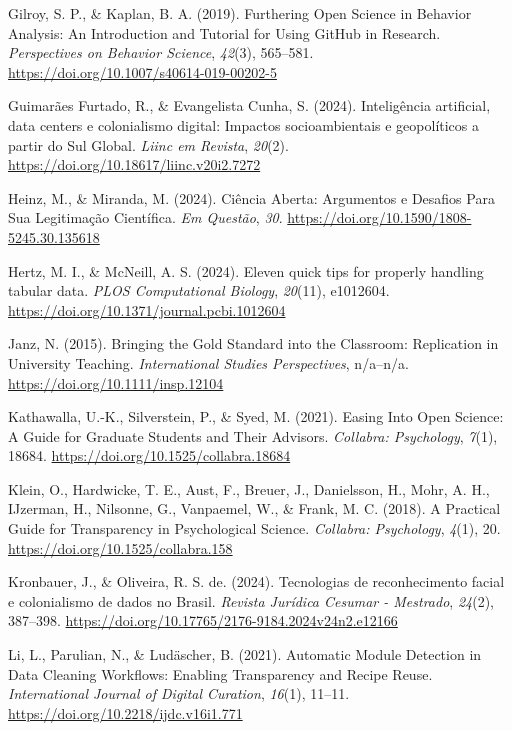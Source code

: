 \documentclass[
  a4paper,
]{book}
\newlength{\cslhangindent}
\newenvironment{CSLReferences}[2] %
 {\begin{list}{}{%
  \setlength{\itemindent}{0pt}
  \setlength{\leftmargin}{0pt}
  \setlength{\parsep}{0pt}
  \ifodd #1
   \setlength{\leftmargin}{\cslhangindent}
   \setlength{\itemindent}{-1\cslhangindent}
  \fi
  \setlength{\itemsep}{#2\baselineskip}}}
 {\end{list}}
\begin{document}
\begin{CSLReferences}{1}{0}
Gilroy, S. P., \& Kaplan, B. A. (2019). Furthering {Open Science} in
{Behavior Analysis}: {An Introduction} and {Tutorial} for {Using GitHub}
in {Research}. \emph{Perspectives on Behavior Science}, \emph{42}(3),
565--581. \url{https://doi.org/10.1007/s40614-019-00202-5}

Guimarães Furtado, R., \& Evangelista Cunha, S. (2024). Inteligência
artificial, data centers e colonialismo digital: Impactos
socioambientais e geopolíticos a partir do Sul Global. \emph{Liinc em
Revista}, \emph{20}(2). \url{https://doi.org/10.18617/liinc.v20i2.7272}

Heinz, M., \& Miranda, M. (2024). Ci{ê}ncia {Aberta}: Argumentos e
Desafios Para Sua Legitima{ç}{ã}o Cient{í}fica. \emph{Em Quest{ã}o},
\emph{30}. \url{https://doi.org/10.1590/1808-5245.30.135618}

Hertz, M. I., \& McNeill, A. S. (2024). Eleven quick tips for properly
handling tabular data. \emph{PLOS Computational Biology}, \emph{20}(11),
e1012604. \url{https://doi.org/10.1371/journal.pcbi.1012604}

Janz, N. (2015). Bringing the {Gold Standard} into the {Classroom}:
{Replication} in {University Teaching}. \emph{International Studies
Perspectives}, n/a--n/a. \url{https://doi.org/10.1111/insp.12104}

Kathawalla, U.-K., Silverstein, P., \& Syed, M. (2021). Easing {Into
Open Science}: {A Guide} for {Graduate Students} and {Their Advisors}.
\emph{Collabra: Psychology}, \emph{7}(1), 18684.
\url{https://doi.org/10.1525/collabra.18684}

Klein, O., Hardwicke, T. E., Aust, F., Breuer, J., Danielsson, H., Mohr,
A. H., IJzerman, H., Nilsonne, G., Vanpaemel, W., \& Frank, M. C.
(2018). A {Practical Guide} for {Transparency} in {Psychological
Science}. \emph{Collabra: Psychology}, \emph{4}(1), 20.
\url{https://doi.org/10.1525/collabra.158}

Kronbauer, J., \& Oliveira, R. S. de. (2024). Tecnologias de
reconhecimento facial e colonialismo de dados no Brasil. \emph{Revista
Jurídica Cesumar - Mestrado}, \emph{24}(2), 387--398.
\url{https://doi.org/10.17765/2176-9184.2024v24n2.e12166}

Li, L., Parulian, N., \& Ludäscher, B. (2021). Automatic Module
Detection in Data Cleaning Workflows: Enabling Transparency and Recipe
Reuse. \emph{International Journal of Digital Curation}, \emph{16}(1),
11--11. \url{https://doi.org/10.2218/ijdc.v16i1.771}


\end{CSLReferences}
\end{document}
